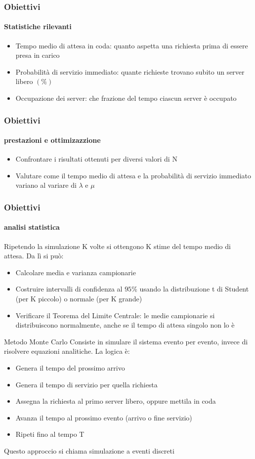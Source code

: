 \documentclass{beamer}
\begin{document}
\begin{frame}
    \frametitle{Obiettivi}
    \framesubtitle{Statistiche rilevanti}
    \begin{itemize}
        \item Tempo medio di attesa in coda: quanto aspetta una richiesta prima di essere presa in carico
        \item Probabilità di servizio immediato: quante richieste trovano subito un server libero $(\%)$
        \item Occupazione dei server: che frazione del tempo ciascun server è occupato
    \end{itemize}
\end{frame}

\begin{frame}
    \frametitle{Obiettivi}
    \framesubtitle{prestazioni e ottimizazzione}
    \begin{itemize}
        \item Confrontare i risultati ottenuti per diversi valori di N
        \item Valutare come il tempo medio di attesa e la probabilità di servizio immediato variano al variare di $\lambda $ e $ \mu$
    \end{itemize}
\end{frame}


\begin{frame}
    \frametitle{Obiettivi}
    \framesubtitle{analisi statistica}
    Ripetendo la simulazione K volte si ottengono K stime del tempo medio di attesa. Da lì si può:
    \begin{itemize}
        \item Calcolare media e varianza campionarie
        \item Costruire intervalli di confidenza al $95\%$ usando la distribuzione t di Student (per K piccolo) o normale (per K grande)
        \item Verificare il Teorema del Limite Centrale: le medie campionarie si distribuiscono normalmente, anche se il tempo di attesa singolo non lo è
    \end{itemize}
\end{frame}

\begin{frame}{Metodo Monte Carlo}
Consiste in  simulare il sistema evento per evento, invece di risolvere equazioni analitiche. La logica è:
\begin{itemize}
    \item Genera il tempo del prossimo arrivo
    \item Genera il tempo di servizio per quella richiesta
    \item Assegna la richiesta al primo server libero, oppure mettila in coda
    \item Avanza il tempo al prossimo evento (arrivo o fine servizio)
    \item Ripeti fino al tempo T
\end{itemize}

Questo approccio si chiama simulazione a eventi discreti

\end{frame}
\end{document}
